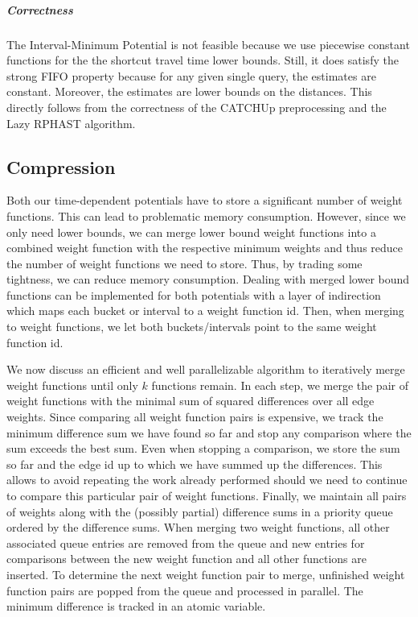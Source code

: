 \documentclass[a4paper,UKenglish,cleveref, autoref, thm-restate,anonymous]{lipics-v2021}
\begin{document}

\subparagraph{Correctness}
The Interval-Minimum Potential is not feasible because we use piecewise constant functions for the the shortcut travel time lower bounds.
Still, it does satisfy the strong FIFO property because for any given single query, the estimates are constant.
Moreover, the estimates are lower bounds on the distances.
This directly follows from the correctness of the CATCHUp preprocessing and the Lazy RPHAST algorithm.

\subsection{Compression}\label{sec:compression}

Both our time-dependent potentials have to store a significant number of weight functions.
This can lead to problematic memory consumption.
However, since we only need lower bounds, we can merge lower bound weight functions into a combined weight function with the respective minimum weights and thus reduce the number of weight functions we need to store.
Thus, by trading some tightness, we can reduce memory consumption.
Dealing with merged lower bound functions can be implemented for both potentials with a layer of indirection which maps each bucket or interval to a weight function id.
Then, when merging to weight functions, we let both buckets/intervals point to the same weight function id.

We now discuss an efficient and well parallelizable algorithm to iteratively merge weight functions until only $k$ functions remain.
In each step, we merge the pair of weight functions with the minimal sum of squared differences over all edge weights.
Since comparing all weight function pairs is expensive, we track the minimum difference sum we have found so far and stop any comparison where the sum exceeds the best sum.
Even when stopping a comparison, we store the sum so far and the edge id up to which we have summed up the differences.
This allows to avoid repeating the work already performed should we need to continue to compare this particular pair of weight functions.
Finally, we maintain all pairs of weights along with the (possibly partial) difference sums in a priority queue ordered by the difference sums.
When merging two weight functions, all other associated queue entries are removed from the queue and new entries for comparisons between the new weight function and all other functions are inserted.
To determine the next weight function pair to merge, unfinished weight function pairs are popped from the queue and processed in parallel.
The minimum difference is tracked in an atomic variable.
\end{document}
